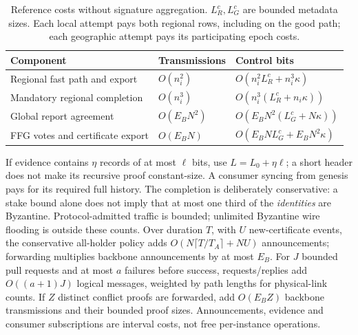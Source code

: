 \documentclass[11pt,a4paper,onecolumn]{article}
\theoremstyle{remark}\newtheorem{example}[definition]{Example}
\begin{document}
\begin{table}[htbp]\centering\small
\begin{tabularx}{\textwidth}{@{}p{}p{}Y@{}}\toprule
Component & Transmissions & Control bits\\\midrule
Regional fast path and export & $O(n_i^2)$ & $O(n_i^2L_R^c+n_i^3\kappa)$\\
Mandatory regional completion & $O(n_i^3)$ & $O(n_i^3(L_R^c+n_i\kappa))$\\
Global report agreement & $O(E_BN^2)$ & $O(E_BN^2(L_G^c+N\kappa))$\\
FFG votes and certificate export & $O(E_BN)$ & $O(E_BNL_G^c+E_BN^2\kappa)$\\\bottomrule
\end{tabularx}
\caption{Reference costs without signature aggregation. $L_R^c,L_G^c$ are
bounded metadata sizes. Each local attempt pays both regional rows, including
on the good path; each geographic attempt pays its participating epoch costs.}
\end{table}

If evidence contains $\eta$ records of at most $\ell$ bits, use
$L=L_0+\eta\ell$; a short header does not make its recursive proof constant-size.
A consumer syncing from genesis pays for its required full history. The
completion is deliberately conservative: a stake bound alone does not imply
that at most one third of the \emph{identities} are Byzantine. Protocol-admitted
traffic is bounded; unlimited Byzantine wire flooding is outside these counts.
Over duration $T$, with $U$ new-certificate events, the conservative
all-holder policy adds $O(N\lceil T/T_A\rceil+NU)$ announcements; forwarding
multiplies backbone announcements by at most $E_B$. For $J$ bounded pull requests
and at most $a$ failures before success, requests/replies add $O((a+1)J)$ logical
messages, weighted by path lengths for physical-link counts. If $Z$ distinct
conflict proofs are forwarded, add $O(E_BZ)$ backbone transmissions and their
bounded proof sizes. Announcements, evidence and consumer subscriptions are
interval costs, not free per-instance operations.
\end{document}
